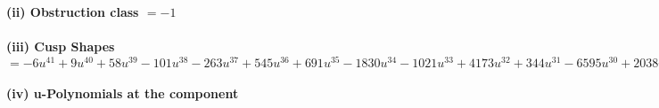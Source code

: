 \documentclass[1p]{elsarticle_modified}
\theoremstyle{definition}
\begin{document}
\flushleft \textbf{(ii) Obstruction class $= -1$}\\~\\
\flushleft \textbf{(iii) Cusp Shapes $= -6 u^{41}+9 u^{40}+58 u^{39}-101 u^{38}-263 u^{37}+545 u^{36}+691 u^{35}-1830 u^{34}-1021 u^{33}+4173 u^{32}+344 u^{31}-6595 u^{30}+2038 u^{29}+6914 u^{28}-5159 u^{27}-3793 u^{26}+6460 u^{25}-1008 u^{24}-4436 u^{23}+3755 u^{22}+744 u^{21}-2743 u^{20}+1497 u^{19}+47 u^{18}-1234 u^{17}+1369 u^{16}-10 u^{15}-898 u^{14}+560 u^{13}-14 u^{12}-332 u^{11}+300 u^{10}+6 u^9-87 u^8+54 u^7-69 u^6-18 u^5+67 u^4-23 u^3+7 u^2+4 u-13$}\\~\\
\newpage\renewcommand{\arraystretch}{1}
\flushleft \textbf{(iv) u-Polynomials at the component}\newline \\
\end{document}
